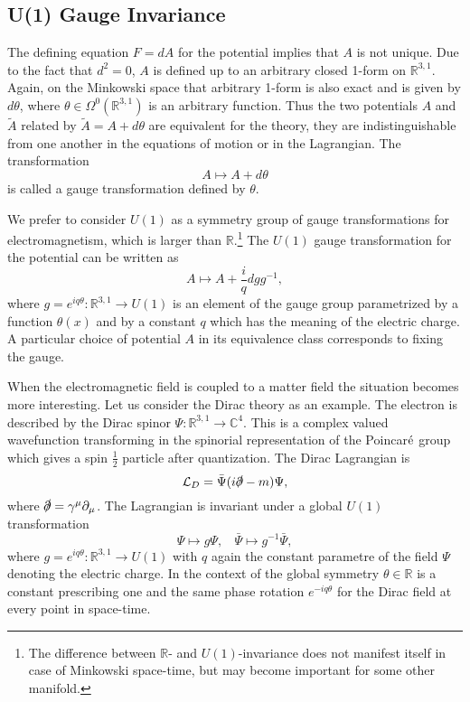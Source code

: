 \documentclass[11pt]{report}
\theoremstyle{plain}
\theoremstyle{definition}
\theoremstyle{remark}
\theoremstyle{remark}
\numberwithin{equation}{section}
\begin{document}
\subsection{U(1) Gauge Invariance}

The defining equation $F=dA$ for the potential implies that $A$ is not unique. Due to the fact that $d^2 =0$, $A$ is defined up to an arbitrary closed 1-form on $\mathbb{R}^{3,1}$. Again, on the Minkowski space that arbitrary 1-form is also exact and is given by $d\theta$, where $\theta\in \Omega^0(\mathbb{R}^{3,1})$ is an arbitrary function. Thus the two potentials $A$ and $\tilde{A}$ related by $\tilde{A} = A + d\theta$ are equivalent for the theory, they are indistinguishable from one another in the equations of motion or in the Lagrangian. 
The transformation 
%
\begin{equation}\label{GTEM}
A \longmapsto A + d\theta
\end{equation} 
%
is called a gauge transformation defined by $\theta$. 

We prefer to consider $U(1)$ as a symmetry group of gauge transformations for electromagnetism, which is larger than $\mathbb{R}$.\footnote{The difference between $\mathbb{R}$- and $U(1)$-invariance does not manifest itself in case of Minkowski space-time, but may become important for some other manifold.} 
The $U(1)$ gauge transformation for the potential can be written as
\begin{equation}
A \longmapsto A + \frac{i}{q}dg g^{-1},
\end{equation}
where $g = e^{iq\theta}: \mathbb{R}^{3,1} \to U(1)$ is an element of the gauge group parametrized by a function $\theta (x)$ and by a constant $q$ which has the meaning of the electric charge.
A particular choice of potential $A$ in its equivalence class corresponds to fixing the gauge. 

When the electromagnetic field is coupled to a matter field the situation becomes more interesting. Let us consider the Dirac theory as an example. The electron is described by the Dirac spinor $\Psi : \mathbb{R}^{3,1} \to \mathbb{C}^4$. This is a complex valued wavefunction transforming in the spinorial representation of the Poincar$\acute{\rm e}$ group which gives a spin $\frac{1}{2}$  particle after quantization. The Dirac Lagrangian is
%
\begin{equation}\label{DL}
\mathcal{L}_D = \bar{\Psi}(i \slashed{\partial} - m)\Psi,
\end{equation}
%
where $\slashed{\partial} = \gamma^{\mu} \partial_{\mu}$. 
The Lagrangian is invariant under a global $U(1)$ transformation
%
\begin{equation}
\Psi \longmapsto g\Psi , \,\,\,\,\ \bar{\Psi} \longmapsto g^{-1}\bar{\Psi},
\end{equation}
where $g = e^{iq\theta}: \mathbb{R}^{3,1} \to U(1)$ with $q$ again the constant parametre of the field $\Psi$ denoting the electric charge. In the context of the global symmetry $\theta \in \mathbb{R}$ is a constant prescribing one and the same phase rotation $e^{-iq\theta}$ for the Dirac field at every point in space-time. 
\end{document}
